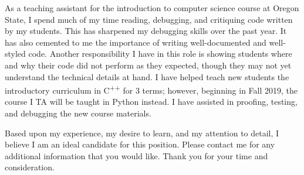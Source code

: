 \documentclass[11pt,a4paper,roman]{moderncv}        %
\begin{document}
As a teaching assistant for the introduction to computer science course at Oregon State, I spend much of my time reading, debugging, and critiquing code written by my students. This has sharpened my debugging skills over the past year. It has also cemented to me the importance of writing well-documented and well-styled code. Another responsibility I have in this role is showing students where and why their code did not perform as they expected, though they may not yet understand the technical details at hand. I have helped teach new students the introductory curriculum in C\textsuperscript{++} for 3 terms; however, beginning in Fall 2019, the course I TA will be taught in Python instead. I have assisted in proofing, testing, and debugging the new course materials.


Based upon my experience, my desire to learn, and my attention to detail, I believe I am an ideal candidate for this position. Please contact me for any additional information that you would like. Thank you for your time and consideration. 



\makeletterclosing
\end{document}

